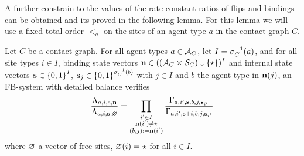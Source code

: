 A further constrain to the values of
the rate constant ratios of flips and bindings
can be obtained and its proved in the following lemma.
For this lemma we will use a fixed total order $<_a$
on the sites of an agent type $a$ in the contact graph $C$.

\begin{lemma}
  \label{lemma:flipbind}
  Let $C$ be a contact graph.
  For all agent types $a \in \mathcal{A}_C$,
  let $I = \sigma_C^{-1}(a)$,
  and for all
  site types $i \in I$, %
  binding state vectors
  $\boldsymbol{\mathbf{n}} \in ((\mathcal{A}_C\times\mathcal{S}_C)\operatorname*{\cup}\left\{ \star \right\})^I$
  and internal state vectors
  $\boldsymbol{\mathbf{s}} \in \left\{ 0,1 \right\}^I$,
  $\boldsymbol{\mathbf{s}}_{j} \in \left\{ 0,1 \right\}^{\sigma_C^{-1}(b)}$
  with $j \in I$ and $b$ the agent type in $\boldsymbol{\mathbf{n}}(j)$,
  an FB-system with detailed balance verifies
  \begin{equation}
    \label{eq:flipbind}
    \frac{\Lambda_{a,i,\boldsymbol{\mathbf{s}},\boldsymbol{\mathbf{n}}}}{
          \Lambda_{a,i,\boldsymbol{\mathbf{s}},\varnothing}} =
    \prod_{\substack{i' \in I\\\boldsymbol{\mathbf{n}}(i') \neq \star\\\left(b,j\right) := \boldsymbol{\mathbf{n}}(i')}}
    \frac{\Gamma_{a,i',\boldsymbol{\mathbf{s}},b,j,\boldsymbol{\mathbf{s}}_{i'}}}{
          \Gamma_{a,i',\boldsymbol{\mathbf{s}}+i,b,j,\boldsymbol{\mathbf{s}}_{i'}}}
  \end{equation}
  where $\varnothing$ a vector of free sites,
  \ie $\varnothing(i) = \star$ for all $i \in I$.
\end{lemma}
